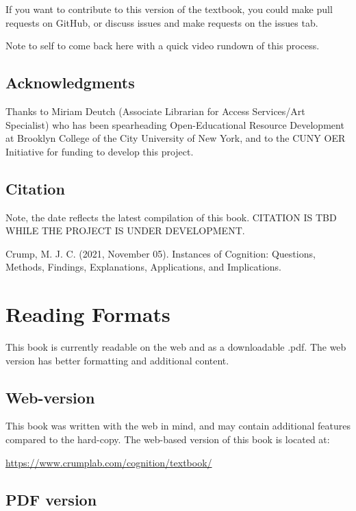\documentclass[
  oneside,
  12pt]{crumpbook}
\begin{document}
If you want to contribute to this version of the textbook, you could make pull requests on GitHub, or discuss issues and make requests on the issues tab.

Note to self to come back here with a quick video rundown of this process.

\hypertarget{acknowledgments}{%
\section{Acknowledgments}\label{acknowledgments}}

Thanks to Miriam Deutch (Associate Librarian for Access Services/Art Specialist) who has been spearheading Open-Educational Resource Development at Brooklyn College of the City University of New York, and to the CUNY OER Initiative for funding to develop this project.

\hypertarget{citation}{%
\section{Citation}\label{citation}}

Note, the date reflects the latest compilation of this book. CITATION IS TBD WHILE THE PROJECT IS UNDER DEVELOPMENT.

Crump, M. J. C. (2021, November 05). Instances of Cognition: Questions, Methods, Findings, Explanations, Applications, and Implications.

\hypertarget{reading-formats}{%
\chapter*{Reading Formats}\label{reading-formats}}

This book is currently readable on the web and as a downloadable .pdf. The web version has better formatting and additional content.

\hypertarget{web-version}{%
\section{Web-version}\label{web-version}}

This book was written with the web in mind, and may contain additional features compared to the hard-copy. The web-based version of this book is located at:

\url{https://www.crumplab.com/cognition/textbook/}

\hypertarget{pdf-version}{%
\section{PDF version}\label{pdf-version}}
\end{document}

